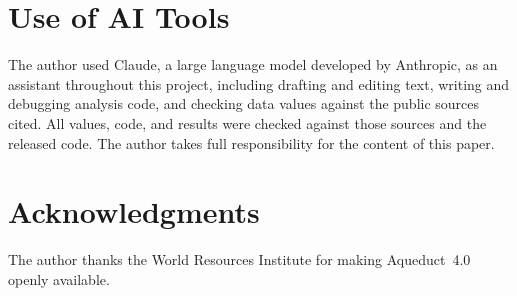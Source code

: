 \documentclass[conference,10pt]{IEEEtran}
\begin{document}
\section*{Use of AI Tools}

The author used Claude, a large language model developed by Anthropic, as
an assistant throughout this project, including drafting and editing text,
writing and debugging analysis code, and checking data values against the
public sources cited. All values, code, and results were checked against
those sources and the released code. The author takes full responsibility
for the content of this paper.

\section*{Acknowledgments}

The author thanks the World Resources Institute for making Aqueduct~4.0
openly available.



\end{document}
